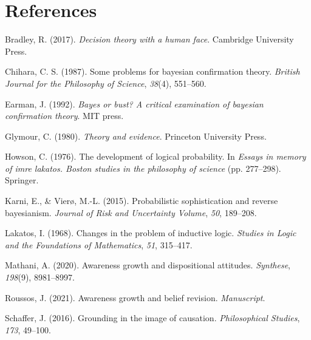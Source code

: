 \documentclass[
  11pt,
  dvipsnames,enabledeprecatedfontcommands]{scrartcl}
\newlength{\cslhangindent}
\newlength{\cslentryspacingunit} %
\newenvironment{CSLReferences}[2] %
 {%
  \setlength{\parindent}{0pt}
  \ifodd #1
  \let\oldpar\par
  \def\par{\hangindent=\cslhangindent\oldpar}
  \fi
  \setlength{\parskip}{#2\cslentryspacingunit}
 }%
 {}
\begin{document}
\singlespace

\hypertarget{references}{%
\section*{References}\label{references}}

\hypertarget{refs}{}
\begin{CSLReferences}{1}{0}
\leavevmode{}%
Bradley, R. (2017). \emph{Decision theory with a human face}. Cambridge
University Press.

\leavevmode{}%
Chihara, C. S. (1987). Some problems for bayesian confirmation theory.
\emph{British Journal for the Philosophy of Science}, \emph{38}(4),
551--560.

\leavevmode{}%
Earman, J. (1992). \emph{Bayes or bust? A critical examination of
bayesian confirmation theory}. MIT press.

\leavevmode{}%
Glymour, C. (1980). \emph{Theory and evidence}. Princeton University
Press.

\leavevmode{}%
Howson, C. (1976). The development of logical probability. In
\emph{Essays in memory of imre lakatos. Boston studies in the philosophy
of science} (pp. 277--298). Springer.

\leavevmode{}%
Karni, E., \& Vierø, M.-L. (2015). Probabilistic sophistication and
reverse bayesianism. \emph{Journal of Risk and Uncertainty Volume},
\emph{50}, 189--208.

\leavevmode{}%
Lakatos, I. (1968). Changes in the problem of inductive logic.
\emph{Studies in Logic and the Foundations of Mathematics}, \emph{51},
315--417.

\leavevmode{}%
Mathani, A. (2020). Awareness growth and dispositional attitudes.
\emph{Synthese}, \emph{198}(9), 8981--8997.

\leavevmode{}%
Roussos, J. (2021). Awareness growth and belief revision.
\emph{Manuscript}.

\leavevmode{}%
Schaffer, J. (2016). Grounding in the image of causation.
\emph{Philosophical Studies}, \emph{173}, 49--100.


\end{CSLReferences}
\end{document}
